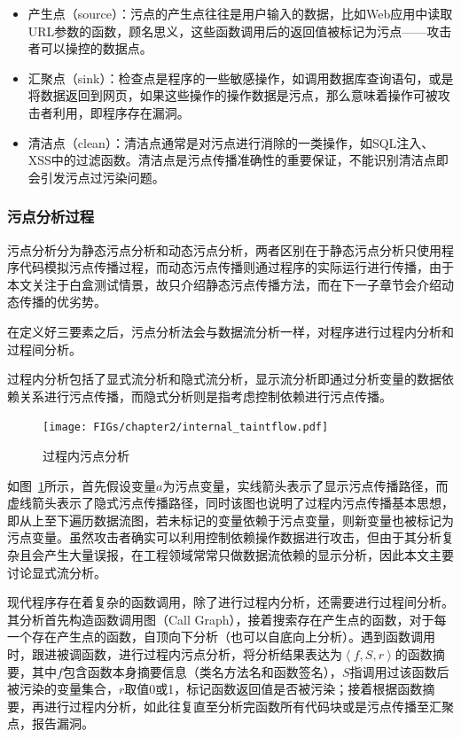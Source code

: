 \begin{itemize}
	\item 产生点（source）：污点的产生点往往是用户输入的数据，比如Web应用中读取URL参数的函数，顾名思义，这些函数调用后的返回值被标记为污点——攻击者可以操控的数据点。
	\item 汇聚点（sink）：检查点是程序的一些敏感操作，如调用数据库查询语句，或是将数据返回到网页，如果这些操作的操作数据是污点，那么意味着操作可被攻击者利用，即程序存在漏洞。
	\item 清洁点（clean）：清洁点通常是对污点进行消除的一类操作，如SQL注入、XSS中的过滤函数。清洁点是污点传播准确性的重要保证，不能识别清洁点即会引发污点过污染问题。
\end{itemize}


\subsubsection{污点分析过程}         
污点分析分为静态污点分析和动态污点分析，两者区别在于静态污点分析只使用程序代码模拟污点传播过程，而动态污点传播则通过程序的实际运行进行传播，由于本文关注于白盒测试情景，故只介绍静态污点传播方法，而在下一子章节会介绍动态传播的优劣势。

在定义好三要素之后，污点分析法会与数据流分析一样，对程序进行过程内分析和过程间分析。

过程内分析包括了显式流分析和隐式流分析，显示流分析即通过分析变量的数据依赖关系进行污点传播，而隐式分析则是指考虑控制依赖进行污点传播。

\begin{figure}[!htbp]
	\centering
	\texttt{[image: FIGs/chapter2/internal\_taintflow.pdf]}
	\caption{过程内污点分析}\label{internalflow}
\end{figure}

如图~\ref{internalflow}所示，首先假设变量$a$为污点变量，实线箭头表示了显示污点传播路径，而虚线箭头表示了隐式污点传播路径，同时该图也说明了过程内污点传播基本思想，即从上至下遍历数据流图，若未标记的变量依赖于污点变量，则新变量也被标记为污点变量。虽然攻击者确实可以利用控制依赖操作数据进行攻击，但由于其分析复杂且会产生大量误报，在工程领域常常只做数据流依赖的显示分析，因此本文主要讨论显式流分析。

现代程序存在着复杂的函数调用，除了进行过程内分析，还需要进行过程间分析。其分析首先构造函数调用图（Call Graph），接着搜索存在产生点的函数，对于每一个存在产生点的函数，自顶向下分析（也可以自底向上分析）。遇到函数调用时，跟进被调函数，进行过程内污点分析，将分析结果表达为$\left\langle f, S, r\right\rangle$的函数摘要，其中$f$包含函数本身摘要信息（类名方法名和函数签名），$S$指调用过该函数后被污染的变量集合，$r$取值0或1，标记函数返回值是否被污染；接着根据函数摘要，再进行过程内分析，如此往复直至分析完函数所有代码块或是污点传播至汇聚点，报告漏洞。

